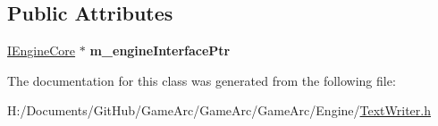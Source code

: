 \subsection*{Public Attributes}
\begin{DoxyCompactItemize}
\item 
\hypertarget{class_text_writer_a322f1ca93660d2385928d301dfdcb379}{\hyperlink{class_i_engine_core}{I\+Engine\+Core} $\ast$ {\bfseries m\+\_\+engine\+Interface\+Ptr}}\label{class_text_writer_a322f1ca93660d2385928d301dfdcb379}

\end{DoxyCompactItemize}


The documentation for this class was generated from the following file\+:\begin{DoxyCompactItemize}
\item 
H\+:/\+Documents/\+Git\+Hub/\+Game\+Arc/\+Game\+Arc/\+Game\+Arc/\+Engine/\hyperlink{_text_writer_8h}{Text\+Writer.\+h}\end{DoxyCompactItemize}
